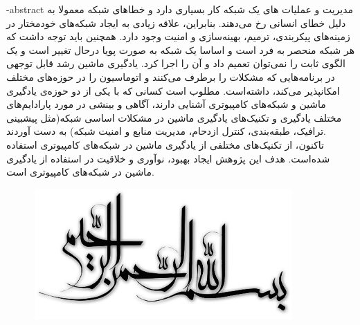 \department{}

\fa-abstract{
مدیریت و عملیات های یک شبکه کار بسیاری دارد و خطا‌های شبکه معمولا به دلیل خطای انسانی رخ می‌دهند. بنابراین، علاقه زیادی به ایجاد شبکه‌های خودمختار در زمینه‌های پیکربندی، ترمیم، بهینه‌سازی و امنیت وجود دارد. همچنین باید توجه داشت که هر شبکه منحصر به فرد است و اساسا یک شبکه به صورت پویا درحال تغییر است و یک الگوی ثابت را نمی‌توان تعمیم داد و آن را اجرا کرد.
یادگیری ماشین رشد قابل توجهی در برنامه‌هایی که مشکلات را برطرف می‌کنند و اتوماسیون را در حوزه‌های مختلف امکانپذیر می‌کند، داشته‌است. مطلوب است کسانی که با یکی از دو حوزه‌ی یادگیری ماشین و شبکه‌های کامپیوتری آشنایی دارند، آگاهی و بینشی در مورد پارادایم‌های مختلف یادگیری و تکنیک‌های یادگیری ماشین در مشکلات اساسی شبکه(مثل پیشبینی ترافیک، طبقه‌بندی، کنترل ازدحام، مدیریت منابع و امنیت شبکه) به دست آوردند.
\\
تاکنون، از تکنیک‌های مختلفی از یادگیری ماشین در شبکه‌های کامپیوتری استفاده شده‌است. هدف این پژوهش ایجاد بهبود، نوآوری و خلاقیت در استفاده از یادگیری ماشین در شبکه‌های کامپیوتری است.
}





\AUTtitle
\vspace*{7cm}
\thispagestyle{empty}
\begin{center}
\includegraphics[height=5cm,width=12cm]{besm}
\end{center}